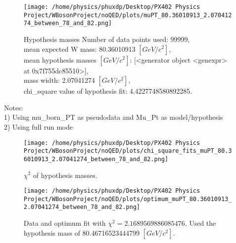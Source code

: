 \documentclass[12pt]{article}
\begin{document}
	\begin{figure}[tb]
		\centering
		\texttt{[image: /home/physics/phuxdp/Desktop/PX402 Physics Project/WBosonProject/noQED/plots/muPT\_80.36010913\_2.07041274\_between\_78\_and\_82.png]}
		\caption{\small Hypothesis masses Number of data points used: 99999,\\
mean expected W mass: 80.36010913 $[GeV/c^{2}]$,\\
mean hypothesis masses $[GeV/c^{2}]$: [<generator object <genexpr> at 0x7f755dc85510>],\\
mass width: 2.07041274 $[GeV/c^{2}]$,\\
chi_square value of hypothesis fit: 4.4227748580892285. }
		\label{fig: fig_0}
	\end{figure}
    Notes: \\
    1) Using mu\_born\_PT as pseudodata and  Mu\_Pt as model/hypothesis\\
    2) Using full run mode\\
       \begin{figure}[tb]
		\centering
		\texttt{[image: /home/physics/phuxdp/Desktop/PX402 Physics Project/WBosonProject/noQED/plots/chi\_square\_fits\_muPT\_80.36010913\_2.07041274\_between\_78\_and\_82.png]}
		\caption{\small $\chi^2$ of hypothesis masses. }
		\label{fig: fig_chi_square}
	\end{figure}

    \begin{figure}[tb]
		\centering
		\texttt{[image: /home/physics/phuxdp/Desktop/PX402 Physics Project/WBosonProject/noQED/plots/optimum\_muPT\_80.36010913\_2.07041274\_between\_78\_and\_82.png]}
		\caption{\small Data and optimum fit with $\chi^2 = 2.1689569886085476$. Used the hypothesis mass of 80.46716523444799 $[GeV/c^{2}]$. }
		\label{fig: fig_optim_parms}
	\end{figure}
    
\end{document}
